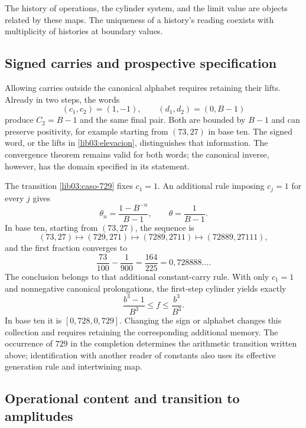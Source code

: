 The history of operations, the cylinder system, and the limit value are
objects related by these maps. The uniqueness of a
history's reading coexists with multiplicity of histories at
boundary values.

\subsection{Signed carries and prospective specification}
\label{lib03:firmados}

Allowing carries outside the canonical alphabet requires retaining their
lifts. Already in two steps, the words
\[
 (c_1,c_2)=(1,-1),\qquad(d_1,d_2)=(0,B-1)
\]
produce \(C_2=B-1\) and the same final pair. Both are bounded by
\(B-1\) and can preserve positivity, for example starting from
\((73,27)\) in base ten. The signed word, or the lifts in
\eqref{lib03:elevacion}, distinguishes that information. The convergence
theorem remains valid for both words; the canonical inverse,
however, has the domain specified in its statement.

The transition \eqref{lib03:caso-729} fixes \(c_1=1\). An additional
rule imposing \(c_j=1\) for every \(j\) gives
\begin{equation}
 \theta_n=\frac{1-B^{-n}}{B-1},\qquad
 \theta=\frac1{B-1}.
 \label{lib03:acarreo-constante}
\end{equation}
In base ten, starting from \((73,27)\), the sequence is
\[
 (73,27)\longmapsto(729,271)\longmapsto(7289,2711)
 \longmapsto(72889,27111),
\]
and the first fraction converges to
\begin{equation}
 \frac{73}{100}-\frac1{900}=\frac{164}{225}
 =0{,}728888\ldots.
 \label{lib03:limite-constante}
\end{equation}
The conclusion belongs to that additional constant-carry rule.
With only \(c_1=1\) and nonnegative canonical prolongations, the
first-step cylinder yields exactly
\begin{equation}
 \frac{b^3-1}{B^3}\leq f\leq\frac{b^3}{B^3}.
 \label{lib03:primer-cilindro}
\end{equation}
In base ten it is \([0{,}728,0{,}729]\). Changing the sign or alphabet
changes this collection and requires retaining the corresponding
additional memory. The occurrence of \(729\) in the completion determines
the arithmetic transition written above; identification with another reader of
constants also uses its effective generation rule and
intertwining map.

\subsection{Operational content and transition to amplitudes}
\label{lib03:operativo}

